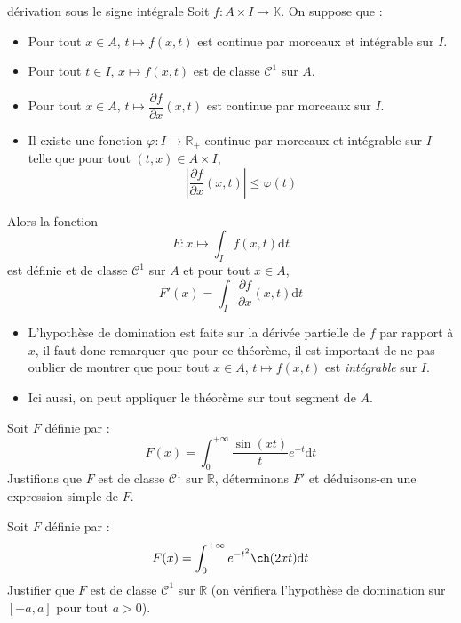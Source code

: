\documentclass[french,11pt,twoside]{VcCours}
\newcommand{\dt}{\text{d}t}
\begin{document}
\begin{Theoreme}{dérivation sous le signe intégrale}
Soit $f : A \times I \rightarrow \mathbb{K}$. On suppose que :
\begin{itemize}
\item Pour tout $x \in A$, $t \mapsto f(x,t)$ est continue par morceaux et intégrable sur $I$.
\item Pour tout $t \in I$, $x \mapsto f(x,t)$ est de classe $\mathcal{C}^1$ sur $A$.
\item Pour tout $x \in A$, $t \mapsto \dfrac{\partial f}{\partial x}(x,t)$ est continue par morceaux sur $I$.
\item Il existe une fonction $\varphi : I \rightarrow \mathbb{R}_+$ continue par morceaux et intégrable sur $I$ telle que pour tout $(t,x) \in A \times I$,
$$ \left\vert \dfrac{\partial f}{\partial x}(x,t) \right\vert \leq \varphi(t)$$
\end{itemize}
Alors la fonction 
$$ F : x \mapsto \int_{I} f(x,t) \dt$$
est définie et de classe $\mathcal{C}^1$ sur $A$ et pour tout $x \in A$,
$$ F'(x) = \int_{I}  \dfrac{\partial f}{\partial x}(x,t) \dt$$
\end{Theoreme}

\begin{Remarques}{}
\begin{itemize}
\item L'hypothèse de domination est faite sur la dérivée partielle de $f$ par rapport à $x$, il faut donc remarquer que pour ce théorème, il est important de ne pas oublier de montrer que pour tout $x \in A$, $t \mapsto f(x,t)$ est \emph{intégrable} sur $I$. 
\item Ici aussi, on peut appliquer le théorème sur tout segment de $A$.
\end{itemize}
\end{Remarques}{}

\newpage
\begin{Exemple} Soit $F$ définie par :
$$ F(x) = \int_{0}^{+ \infty} \frac{\sin(xt)}{t} e^{-t} \dt$$
Justifions que $F$ est de classe $\mathcal{C}^1$ sur $\mathbb{R}$, déterminons $F'$ et déduisons-en une expression simple de $F$.

\vspace*{10cm}
\end{Exemple}


\begin{ApplicationDirecte}{} Soit $F$ définie par :
$$ F(x) = \int_{0}^{+ \infty} e^{-t^2} \ch(2xt) \dt$$
Justifier que $F$ est de classe $\mathcal{C}^1$ sur $\mathbb{R}$ (on vérifiera l'hypothèse de domination sur $[-a,a]$ pour tout $a>0$).
\end{ApplicationDirecte}
\end{document}
